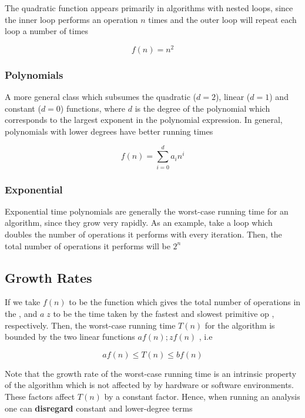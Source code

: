 	\par{The quadratic function appears primarily in algorithms with nested
			loops, since the inner loop performs an operation $n$ times and the
	outer loop will repeat each loop a  number of times}

	$$f(n) = n^2$$

\subsubsection{Polynomials}

\par{A more general class which subsumes the quadratic ($d=2$), linear ($d=1$)
		and constant ($d=0$) functions, where $d$ is the degree of the
		polynomial which corresponds to the largest exponent in the polynomial
		expression. In general, polynomials with lower degrees have better
running times}

$$f(n) = \sum_{i=0}^{d} a_{i}n^{i}$$

\subsubsection{Exponential}

	\par{Exponential time polynomials are generally the worst-case running time
			for an algorithm, since they grow very rapidly. As an example, take
			a loop which doubles the number of operations it performs with every
			iteration. Then, the total number of operations it performs will be
	$2^n$}


\subsection{Growth Rates}


	\par{If we take $f(n)$ to be the function which gives the total number of
			operations in the , and $a\;z$ to be the time taken
			by the fastest and slowest primitive op , respectively. Then, the
			worst-case running time $T(n)$ for the algorithm is bounded by the two
	linear functions $af(n);zf(n)$ , i.e}

	$$af(n) \leq T(n) \leq bf(n)$$

	\par{Note that the growth rate of the worst-case running time is an
			intrinsic property of the algorithm which is not affected by by
	hardware or software environments. These factors affect $T(n)$ by a constant
	factor. Hence, when running an analysis one can \textbf{disregard} constant
	and lower-degree terms}

